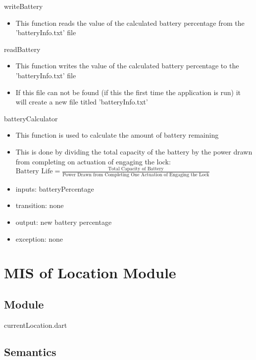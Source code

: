 \documentclass[12pt, titlepage]{article}
\begin{document}
\noindent writeBattery
\begin{itemize}
\item This function reads the value of the calculated battery percentage from the 'batteryInfo.txt' file
\end{itemize}

\noindent readBattery
\begin{itemize}
\item This function writes the value of the calculated battery percentage to the 'batteryInfo.txt' file
\item If this file can not be found (if this the first time the application is run) it will create a new file titled 'batteryInfo.txt'
\end{itemize}

\noindent batteryCalculator
\begin{itemize}
\item This function is used to calculate the amount of battery remaining
\item This is done by dividing the total capacity of the battery by the power drawn from completing on actuation of engaging the lock: \newline $\text{Battery Life} = \frac{\text{Total Capacity of Battery}}{\text{Power Drawn from Completing One Actuation of Engaging the Lock}}$
\end{itemize}

\begin{itemize}
\item inputs: batteryPercentage
\item transition: none
\item output: new battery percentage
\item exception: none
\end{itemize}


\section{MIS of Location Module} \label{mHD}

\subsection{Module}
currentLocation.dart

\subsection{Semantics}
\end{document}
